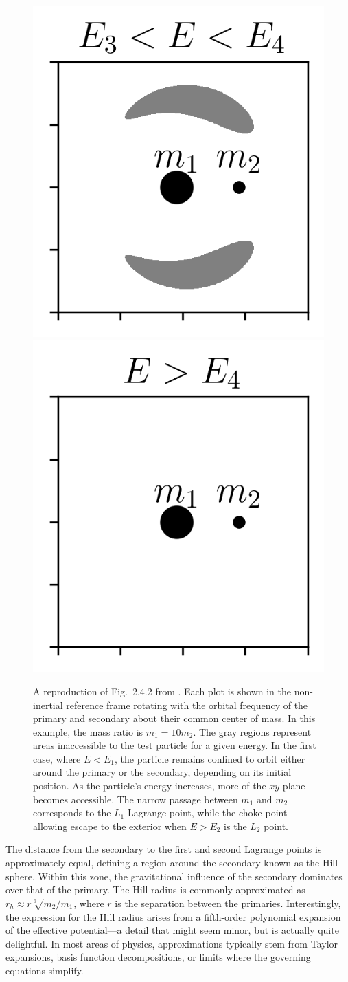 \begin{figure}
            \includegraphics[width=.32\linewidth]{images/CR3BP_forbidden_region_3.png}
            \includegraphics[width=.32\linewidth]{images/CR3BP_forbidden_region_4.png}
            \caption{A reproduction of Fig.~2.4.2 from \citet{koon2000dynamical}. Each plot is shown in the non-inertial reference frame rotating with the orbital frequency of the primary and secondary about their common center of mass. In this example, the mass ratio is \(m_1 = 10 m_2\). The gray regions represent areas inaccessible to the test particle for a given energy. In the first case, where \(E < E_1\), the particle remains confined to orbit either around the primary or the secondary, depending on its initial position. As the particle's energy increases, more of the \(xy\)-plane becomes accessible. The narrow passage between \(m_1\) and \(m_2\) corresponds to the \(L_1\) Lagrange point, while the choke point allowing escape to the exterior when \(E > E_2\) is the \(L_2\) point.}
            \label{fig:CR3BP_forbidden_region}
        \end{figure}

        The distance from the secondary to the first and second Lagrange points is approximately equal, defining a region around the secondary known as the Hill sphere. Within this zone, the gravitational influence of the secondary dominates over that of the primary. The Hill radius is commonly approximated as \( r_h \approx r\sqrt[3]{m_2/m_1} \), where \( r \) is the separation between the primaries. Interestingly, the expression for the Hill radius arises from a fifth-order polynomial expansion of the effective potential—a detail that might seem minor, but is actually quite delightful. In most areas of physics, approximations typically stem from Taylor expansions, basis function decompositions, or limits where the governing equations simplify. 


